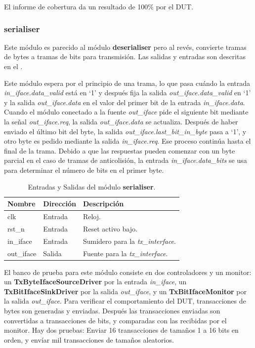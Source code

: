 \documentclass[a4paper, twoside, 11pt]{report}
\begin{document}
El informe de cobertura da un resultado de 100\% por el DUT.

\FloatBarrier
\subsubsection{serialiser}

Este módulo es parecido al módulo \textbf{deserialiser} pero al revés, convierte tramas de bytes a tramas de bits para transmisión. Las salidas y entradas son descritas en el .

Este módulo espera por el principio de una trama, lo que pasa cuándo la entrada \textit{in\_iface.data\_valid} está en ‘1’ y después fija la salida \textit{out\_iface.data\_valid} en ‘1’ y la salida \textit{out\_iface.data} en el valor del primer bit de la entrada \textit{in\_iface.data}. Cuando el módulo conectado a la fuente \textit{out\_iface} pide el siguiente bit mediante la señal \textit{out\_iface.req}, la salida \textit{out\_iface.data} se actualiza. Después de haber enviado el último bit del byte, la salida \textit{out\_iface.last\_bit\_in\_byte} pasa a ‘1’, y otro byte es pedido mediante la salida \textit{in\_iface.req}. Ese proceso continúa hasta el final de la trama. Debido a que las respuestas pueden comenzar con un byte parcial en el caso de tramas de anticolisión, la entrada \textit{in\_iface.data\_bits} se usa para determinar el número de bits en el primer byte.


\begin{table}[htb]
  \centering
  \tablezebra
  \begin{tabulary}{\linewidth}{l|l|L}
    \textbf{Nombre}&\textbf{Dirección}&\textbf{Descripción} \\
    \hline
    clk&Entrada&Reloj. \\
    rst\_n&Entrada&Reset activo bajo. \\
    in\_iface&Entrada&Sumidero para la \textit{tx\_interface}. \\
    out\_iface&Salida&Fuente para la \textit{tx\_interface}. \\
  \end{tabulary}
  \caption{Entradas y Salidas del módulo \textbf{serialiser}.}
  \label{tab:ports_serialiser}
\end{table}

El banco de prueba para este módulo consiste en dos controladores y un monitor: un \textbf{TxByteIfaceSourceDriver} por la entrada \textit{in\_iface}, un \textbf{TxBitIfaceSinkDriver} por la salida \textit{out\_iface}, y un \textbf{TxBitIfaceMonitor} por la salida \textit{out\_iface}. Para verificar el comportamiento del DUT, transacciones de bytes son generadas y enviadas. Después las transacciones enviadas son convertidas a transacciones de bits, y comparadas con las recibidas por el monitor. Hay dos pruebas: Enviar 16 transacciones de tamaños 1 a 16 bits en orden, y envíar mil transacciones de tamaños aleatorios.
\end{document}
